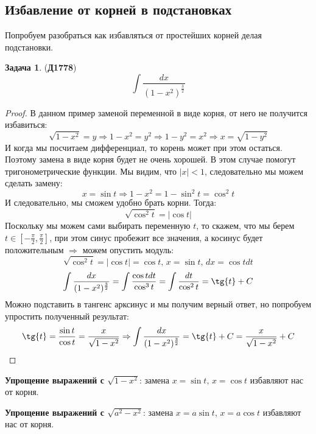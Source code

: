 \documentclass[12pt]{article}
\theoremstyle{definition}
\newtheorem{problem}{Задача}
\DeclareMathOperator{\dint}{\displaystyle\int}
\begin{document}
\subsection*{Избавление от корней в подстановках}
Попробуем разобраться как избавляться от простейших корней делая подстановки.
\begin{problem}(\textbf{Д1778})
	$$
		\dint \dfrac{dx}{(1 - x^2)^{\frac{3}{2}}} 
	$$
\end{problem}
\begin{proof}
	В данном пример заменой переменной в виде корня, от него не получится избавиться:
	$$
		\sqrt{1 - x^2} =y  \Rightarrow 1 - x^2 = y^2 \Rightarrow 1 - y^2 = x^2 \Rightarrow x = \sqrt{1 - y^2}
	$$
	И когда мы посчитаем дифференциал, то корень может при этом остаться. Поэтому замена в виде корня будет не очень хорошей. В этом случае помогут тригонометрические функции. Мы видим, что $|x| < 1$, следовательно мы можем сделать замену: 
	$$
		x = \sin{t} \Rightarrow 1 - x^2 = 1 - \sin^2{t} = \cos^2{t}
	$$ 
	И следовательно, мы сможем удобно брать корни. Тогда:
	$$
		\sqrt{\cos^2{t}} = |\cos{t}|
	$$
	Поскольку мы можем сами выбирать переменную $t$, то скажем, что мы берем $t \in \left[-\frac{\pi}{2}, \frac{\pi}{2}\right]$, при этом синус пробежит все значения, а косинус будет положительным $\Rightarrow$ можем опустить модуль:
	$$
		\sqrt{\cos^2{t}} = |\cos{t}| = \cos{t}, \, 	x = \sin{t}, \,  dx = \cos{t}dt
	$$
	$$
		\dint \dfrac{dx}{(1 - x^2)^{\frac{3}{2}}} = \dint \dfrac{\cos{t}dt}{\cos^3{t}} = \dint\dfrac{dt}{\cos^2{t}} = \tg{t} + C 
	$$
	Можно подставить в тангенс арксинус и мы получим верный ответ, но попробуем упростить полученный результат:
	$$
		\tg{t} = \dfrac{\sin{t}}{\cos{t}} = \dfrac{x}{\sqrt{1 - x^2}}  \Rightarrow \dint \dfrac{dx}{(1 - x^2)^{\frac{3}{2}}} = \tg{t} + C = \dfrac{x}{\sqrt{1 - x^2}} + C
	$$
\end{proof}

\textbf{Упрощение выражений с $\sqrt{1 - x^2}$}: замена $x = \sin{t}, \, x = \cos{t}$ избавляют нас от корня.

\textbf{Упрощение выражений с $\sqrt{a^2 - x^2}$}: замена $x = a\sin{t}, \, x = a  \cos{t}$ избавляют нас от корня.
\end{document}
